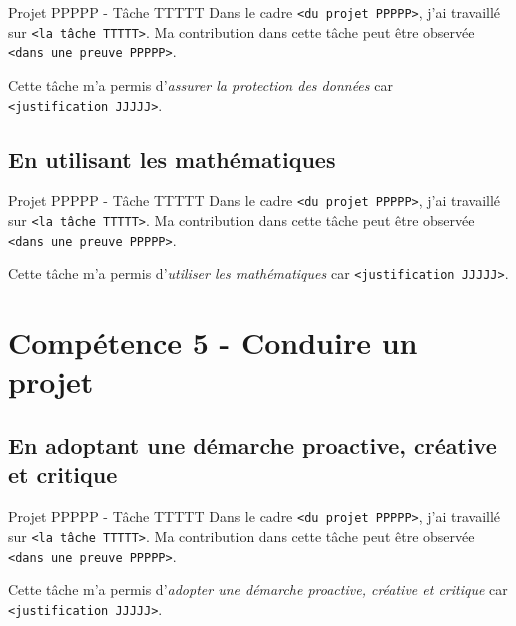 \documentclass[%
    10pt,%
    usenames,%
    dvipsnames%
]{beamer}
\begin{document}
\begin{frame}[fragile]{Projet PPPPP - Tâche TTTTT}
\label{projet-ppppp---tuxe2che-ttttt-14}
Dans le cadre \texttt{\textless{}du\ projet\ PPPPP\textgreater{}}, j'ai
travaillé sur \texttt{\textless{}la\ tâche\ TTTTT\textgreater{}}. Ma
contribution dans cette tâche peut être observée
\texttt{\textless{}dans\ une\ preuve\ PPPPP\textgreater{}}.

Cette tâche m'a permis d'\emph{assurer la protection des données} car
\texttt{\textless{}justification\ JJJJJ\textgreater{}}.
\end{frame}

\subsection{En utilisant les
mathématiques}\label{en-utilisant-les-mathuxe9matiques}

\begin{frame}[fragile]{Projet PPPPP - Tâche TTTTT}
\label{projet-ppppp---tuxe2che-ttttt-15}
Dans le cadre \texttt{\textless{}du\ projet\ PPPPP\textgreater{}}, j'ai
travaillé sur \texttt{\textless{}la\ tâche\ TTTTT\textgreater{}}. Ma
contribution dans cette tâche peut être observée
\texttt{\textless{}dans\ une\ preuve\ PPPPP\textgreater{}}.

Cette tâche m'a permis d'\emph{utiliser les mathématiques} car
\texttt{\textless{}justification\ JJJJJ\textgreater{}}.
\end{frame}

\section{Compétence 5 - Conduire un
projet}\label{compuxe9tence-5---conduire-un-projet}

\subsection{En adoptant une démarche proactive, créative et
critique}\label{en-adoptant-une-duxe9marche-proactive-cruxe9ative-et-critique}

\begin{frame}[fragile]{Projet PPPPP - Tâche TTTTT}
\label{projet-ppppp---tuxe2che-ttttt-16}
Dans le cadre \texttt{\textless{}du\ projet\ PPPPP\textgreater{}}, j'ai
travaillé sur \texttt{\textless{}la\ tâche\ TTTTT\textgreater{}}. Ma
contribution dans cette tâche peut être observée
\texttt{\textless{}dans\ une\ preuve\ PPPPP\textgreater{}}.

Cette tâche m'a permis d'\emph{adopter une démarche proactive, créative
et critique} car \texttt{\textless{}justification\ JJJJJ\textgreater{}}.
\end{frame}
\end{document}
